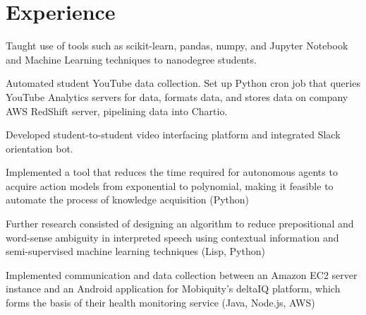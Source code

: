 \documentclass[]{deedy-resume-openfont}
\begin{document}
\hfill
\begin{minipage}[t]{0.66\textwidth} 


\section{Experience}

\vspace{\topsep} %
\begin{tightemize}\item Taught use of tools such as scikit-learn, pandas, numpy, and Jupyter Notebook and Machine Learning techniques to nanodegree students.
\item Automated student YouTube data collection. Set up Python cron job that queries YouTube Analytics servers for data, formats data, and stores data on company AWS RedShift server, pipelining data into Chartio. 
\item Developed student-to-student video interfacing platform and integrated Slack orientation bot.
\end{tightemize}
\sectionsep

\begin{tightemize}
\item Implemented a tool that reduces the time required for autonomous agents to acquire action models from exponential to polynomial, making it feasible to automate the process of knowledge acquisition (Python)

\item Further research consisted of designing an algorithm to reduce prepositional and word-sense ambiguity in interpreted speech using contextual information and semi-supervised machine learning techniques (Lisp, Python)
\end{tightemize}
\sectionsep

\begin{tightemize}
\item Implemented communication and data collection between an Amazon EC2 server instance and an Android application for Mobiquity’s deltaIQ platform, which forms the basis of their health monitoring service (Java, Node.js, AWS)


\end{tightemize}
\end{minipage}
\end{document}

